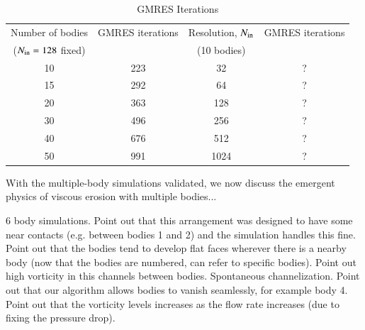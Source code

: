 \documentclass[preprint, 10pt]{elsarticle}
\begin{document}
\begin{table}%
\begin{center}
\caption{GMRES Iterations
}
\vspace{0.3 pc}
\label{itertab}
\begin{tabular}{c c | c c}
\hline
\hspace{0.5pc} Number of bodies
\hspace{0.5pc} & GMRES iterations 
\hspace{0.5pc} & Resolution, $N_{\mathrm{in}}$
\hspace{0.5pc} & GMRES iterations  \\
\hspace{0.0pc} ($N_{\mathrm{in}} = 128$ fixed) & 
\hspace{0.5pc} &(10 bodies) & \\
\hline
%
10	& 223	& 32	    	& ?	\\
15	& 292	& 64    	& ?	\\
20	& 363	& 128	& ?	\\
30	& 496	& 256	& ?	\\
40	& 676	& 512	& ?	\\
50	& 991	& 1024	& ?	\\
%
\hline
\end{tabular}
\end{center}
\end{table}

With the multiple-body simulations validated, we now discuss the emergent physics of viscous erosion with multiple bodies...


6 body simulations. Point out that this arrangement was designed to have some near contacts (e.g. between bodies 1 and 2) and the simulation handles this fine.
Point out that the bodies tend to develop flat faces wherever there is a nearby body (now that the bodies are numbered, can refer to specific bodies). Point out high vorticity in this channels between bodies. Spontaneous channelization. Point out that our algorithm allows bodies to vanish seamlessly, for example body 4. Point out that the vorticity levels increases as the flow rate increases (due to fixing the pressure drop).
\end{document}
